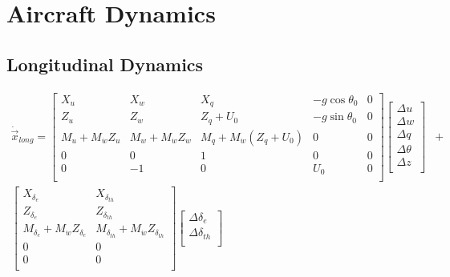 \chapter{Aircraft Dynamics}

\section{Longitudinal Dynamics}
\begin{align*}
    \dot{\vec{x}}_{long} =
    \left[ \begin{array}{ *{5}{c} }
            X_u                     & X_w                     & X_q                                          & -g \cos \theta_0 & 0 \\
            Z_u                     & Z_w                     & Z_q + U_0                                    & -g \sin \theta_0 & 0 \\
            M_u + M_{\dot{w}} Z_{u} & M_w + M_{\dot{w}} Z_{w} & M_q + M_{\dot{w}} \left( Z_{q} + U_0 \right) & 0                & 0 \\
            0                       & 0                       & 1                                            & 0                & 0 \\
            0                       & -1                      & 0                                            & U_0              & 0 \\
        \end{array} \right]
    \left[ \begin{array}{ *{1}{c} }
            \Delta u      \\
            \Delta w      \\
            \Delta q      \\
            \Delta \theta \\
            \Delta z      \\
        \end{array} \right] & + \\
    \left[ \begin{array}{ *{5}{c} }
            X_{\delta_e}                            & X_{\delta_{th}}                               \\
            Z_{\delta_e}                            & Z_{\delta_{th}}                               \\
            M_{\delta_e} + M_{\dot{w}} Z_{\delta_e} & M_{\delta_{th}} + M_{\dot{w}} Z_{\delta_{th}} \\
            0                                       & 0                                             \\
            0                                       & 0                                             \\
        \end{array} \right]
    \left[ \begin{array}{ *{1}{c} }
            \Delta \delta_e    \\
            \Delta \delta_{th} \\
        \end{array} \right] &   \\
\end{align*}

